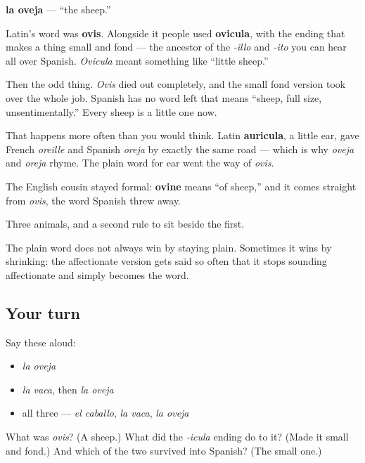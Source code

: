 \begin{cousinweb}
\textbf{la oveja} — \textquotedblleft{}the sheep.\textquotedblright{}

Latin's word was \textbf{ovis}. Alongside it people used \textbf{ovicula}, with the ending that makes a thing small and fond — the ancestor of the \emph{-illo} and \emph{-ito} you can hear all over Spanish. \emph{Ovicula} meant something like \textquotedblleft{}little sheep.\textquotedblright{}

Then the odd thing. \emph{Ovis} died out completely, and the small fond version took over the whole job. Spanish has no word left that means \textquotedblleft{}sheep, full size, unsentimentally.\textquotedblright{} Every sheep is a little one now.

That happens more often than you would think. Latin \textbf{auricula}, a little ear, gave French \emph{oreille} and Spanish \emph{oreja} by exactly the same road — which is why \emph{oveja} and \emph{oreja} rhyme. The plain word for ear went the way of \emph{ovis}.

The English cousin stayed formal: \textbf{ovine} means \textquotedblleft{}of sheep,\textquotedblright{} and it comes straight from \emph{ovis}, the word Spanish threw away.
\end{cousinweb}

\begin{grammarlens}[title={What you've built}]
Three animals, and a second rule to sit beside the first.

The plain word does not always win by staying plain. Sometimes it wins by shrinking: the affectionate version gets said so often that it stops sounding affectionate and simply becomes the word.
\end{grammarlens}

\subsection*{Your turn}
Say these aloud:

\begin{itemize}
\raggedright
  \item \emph{la oveja}
  \item \emph{la vaca}, then \emph{la oveja}
  \item all three — \emph{el caballo}, \emph{la vaca}, \emph{la oveja}
\end{itemize}

\begin{tcolorbox}[breakable,colback=teal!4,colframe=teal!35!black,title={Before you move on}]
What was \emph{ovis}? (A sheep.) What did the \emph{-icula} ending do to it? (Made it small and fond.) And which of the two survived into Spanish? (The small one.)
\end{tcolorbox}
